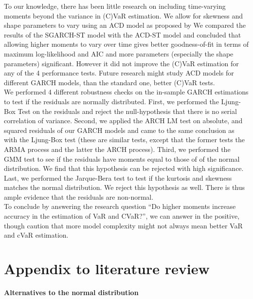 \documentclass[a4paper, nobind]{templates/ociamthesis}
\begin{document}
\noindent To our knowledge, there has been little research on including time-varying moments beyond the variance in (C)VaR estimation. We allow for skewness and shape parameters to vary using an ACD model as proposed by \textcite{ghalanos2016} We compared the results of the SGARCH-ST model with the ACD-ST model and concluded that allowing higher moments to vary over time gives better goodness-of-fit in terms of maximum log-likelihood and AIC and more parameters (especially the shape parameters) significant. However it did not improve the (C)VaR estimation for any of the 4 performance tests. Future research might study ACD models for different GARCH models, than the standard one, better (C)VaR tests.~\\

\noindent We performed 4 different robustness checks on the in-sample GARCH estimations to test if the residuals are normally distributed. First, we performed the Ljung-Box Test on the residuals and reject the null-hypothesis that there is no serial correlation of variance. Second, we applied the ARCH LM test on absolute, and squared residuals of our GARCH models and came to the same conclusion as with the Ljung-Box test (these are similar tests, except that the former tests the ARMA process and the latter the ARCH process). Third, we performed the GMM test to see if the residuals have moments equal to those of of the normal distribution. We find that this hypothesis can be rejected with high significance. Last, we performed the Jarque-Bera test to test if the kurtosis and skewness matches the normal distribution. We reject this hypothesis as well. There is thus ample evidence that the residuals are non-normal.~\\

\noindent To conclude by answering the research question ``Do higher moments increase accuracy in the estimation of VaR and CVaR?'', we can answer in the positive, though caution that more model complexity might not always mean better VaR and cVaR estimation.

\startappendices

\hypertarget{appendix-to-literature-review}{%
\chapter{Appendix to literature review}\label{appendix-to-literature-review}}

\hypertarget{conditional-distributions}{%
\subsubsection{Alternatives to the normal distribution}\label{conditional-distributions}}
\end{document}

